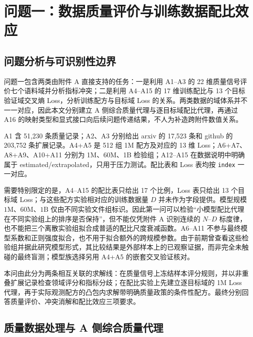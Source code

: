 \section{问题一：数据质量评价与训练数据配比效应}
\label{sec:q1}

\subsection{问题分析与可识别性边界}

问题一包含两类由附件 A 直接支持的任务：一是利用 A1--A3 的 22 维质量信号评价七个语料域并分析指标冲突；二是利用 A4--A15 的 17 维训练配比与 13 个目标验证域交叉熵 Loss，分析训练配方与目标域 Loss 的关系。两类数据的域体系并不一一对应，因此本文分别建立 A 侧综合质量代理与逐目标域配比代理，再通过 A16 的映射类型和显式接口向后续问题传递结果，不人为补造跨附件数值关系。

A1 含 51,230 条质量记录；A2、A3 分别给出 arxiv 的 17,523 条和 github 的 203,752 条扩展记录。A4+A5 是 512 组 1M 配方及对应的 13 维 Loss；A6+A7、A8+A9、A10+A11 分别为 1M、60M、1B 检验组；A12--A15 在数据说明中明确属于 estimated/extrapolated，只用于压力测试。配比表和 Loss 表均按 \texttt{index} 一一对应。

需要特别限定的是，A4--A15 的配比表只给出 17 个比例，Loss 表只给出 13 个目标域 Loss；与这些配方实验相对应的训练数据量 $D$ 并未作为字段提供。模型规模 $1\mathrm{M}$、$60\mathrm{M}$、$1\mathrm{B}$ 仅由不同实验文件组标识。因此第一问可以检验“小模型配比代理在不同实验组上的排序是否保持”，但不能仅凭附件 A 识别连续的 $N$--$D$ 标度律，也不能把三个离散实验组拟合成普适的配比尺度衰减函数。A6--A11 不参与最终模型系数和正则强度拟合，也不用于拟合额外的跨规模参数。由于前期曾查看这些检验组并据此研究模型形式，其比较结果是外部样本上的已观察证据，而非完全未触碰的最终盲测；模型族选择另用 A4+A5 的嵌套交叉验证核对。

本问由此分为两条相互关联的求解线：在质量信号上冻结样本评分规则，并以非重叠扩展记录检查领域评分和指标分歧；在配比实验上先建立逐目标域的 1M Loss 代理，再于实际观测配方的凸包内求解带明确质量政策的条件性配方。最终分别回答质量评价、冲突消解和配比效应三项要求。

\subsection{质量数据处理与 A 侧综合质量代理}

